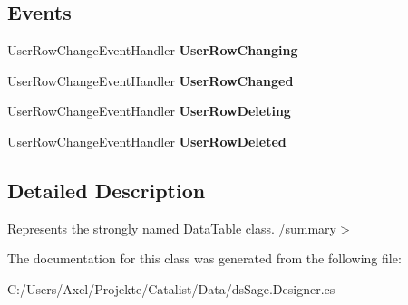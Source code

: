 \subsection*{Events}
\begin{DoxyCompactItemize}
\item 
User\+Row\+Change\+Event\+Handler {\bfseries User\+Row\+Changing}\hypertarget{class_products_1_1_data_1_1ds_sage_1_1_user_data_table_a11dcbdfd316db565f79cd4d45c1bf283}{}\label{class_products_1_1_data_1_1ds_sage_1_1_user_data_table_a11dcbdfd316db565f79cd4d45c1bf283}

\item 
User\+Row\+Change\+Event\+Handler {\bfseries User\+Row\+Changed}\hypertarget{class_products_1_1_data_1_1ds_sage_1_1_user_data_table_a956c50abdf8f54728b173f9b2444264d}{}\label{class_products_1_1_data_1_1ds_sage_1_1_user_data_table_a956c50abdf8f54728b173f9b2444264d}

\item 
User\+Row\+Change\+Event\+Handler {\bfseries User\+Row\+Deleting}\hypertarget{class_products_1_1_data_1_1ds_sage_1_1_user_data_table_aafa4a82c80927178b7b20661496f41ad}{}\label{class_products_1_1_data_1_1ds_sage_1_1_user_data_table_aafa4a82c80927178b7b20661496f41ad}

\item 
User\+Row\+Change\+Event\+Handler {\bfseries User\+Row\+Deleted}\hypertarget{class_products_1_1_data_1_1ds_sage_1_1_user_data_table_a1cea247d89ac7dd658f8601efcd41868}{}\label{class_products_1_1_data_1_1ds_sage_1_1_user_data_table_a1cea247d89ac7dd658f8601efcd41868}

\end{DoxyCompactItemize}


\subsection{Detailed Description}
Represents the strongly named Data\+Table class. /summary$>$ 

The documentation for this class was generated from the following file\+:\begin{DoxyCompactItemize}
\item 
C\+:/\+Users/\+Axel/\+Projekte/\+Catalist/\+Data/ds\+Sage.\+Designer.\+cs\end{DoxyCompactItemize}
